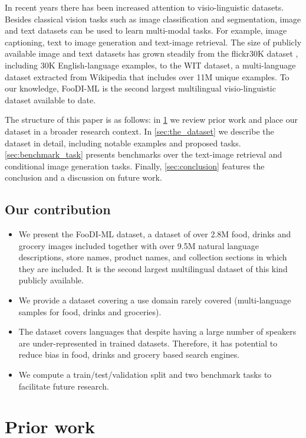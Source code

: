 \documentclass[10pt,twocolumn,letterpaper]{article}
\begin{document}
In recent years there has been increased attention to visio-linguistic datasets. Besides classical vision tasks such as image classification and segmentation, image and text datasets can be used to learn multi-modal tasks. For example, image captioning, text to image generation and text-image retrieval.  The size of publicly available image and text datasets has grown steadily from the flickr30K dataset \cite{young2014image}, including 30K English-language examples, to the WIT dataset, a multi-language dataset extracted from Wikipedia that includes over 11M unique examples. To our knowledge, FooDI-ML is the second largest multilingual visio-linguistic dataset available to date. 

The structure of this paper is as follows: in \cref{sec:prior_work} we review prior work and place our dataset in a broader research context. In \cref{sec:the_dataset} we describe the dataset in detail, including notable examples and proposed tasks. \cref{sec:benchmark_task} presents benchmarks over the text-image retrieval and conditional image generation tasks.  Finally, \cref{sec:conclusion} features the conclusion and a discussion on future work. 



\subsection{Our contribution}
\begin{itemize}
    \item We present the FooDI-ML dataset, a dataset of over 2.8M food, drinks and grocery images included together with over 9.5M natural language descriptions, store names, product names, and collection sections in which they are included. It is the second largest multilingual dataset of this kind publicly available.
    \item We provide a dataset covering a use domain rarely covered (multi-language samples for food, drinks and groceries).
    \item The dataset covers languages that despite having a large number of speakers are under-represented in trained datasets. Therefore, it has potential to reduce bias in food, drinks and grocery based search engines.
    \item We compute a train/test/validation split and two benchmark tasks to facilitate future research.
\end{itemize}
\section{Prior work}
\label{sec:prior_work}
\end{document}
